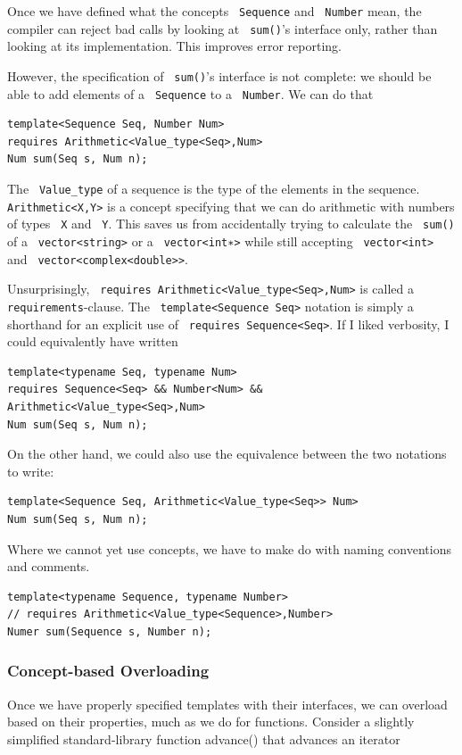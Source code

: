 \documentclass[11pt]{article}
\let\OldTexttt\texttt
\renewcommand{\texttt}[1]{\OldTexttt{\color{MidnightBlue} #1}}
\begin{document}
Once we have defined what the concepts \texttt{Sequence} and \texttt{Number} mean, the compiler can reject bad
calls by looking at \texttt{sum()}'s interface only, rather than looking at its implementation. This
improves error reporting.

However, the specification of \texttt{sum()}'s interface is not complete: we should be able to add
elements of a \texttt{Sequence} to a \texttt{Number}. We can do that
\begin{verbatim}
template<Sequence Seq, Number Num>
requires Arithmetic<Value_type<Seq>,Num>
Num sum(Seq s, Num n);
\end{verbatim}

The \texttt{Value\_type} of a sequence is the type of the elements in the sequence. \texttt{Arithmetic<X,Y>} is a
concept specifying that we can do arithmetic with numbers of types \texttt{X} and \texttt{Y}. This saves us from
accidentally trying to calculate the \texttt{sum()} of a \texttt{vector<string>} or a \texttt{vector<int∗>} while still
accepting \texttt{vector<int>} and \texttt{vector<complex<double>>}.

Unsurprisingly, \texttt{requires Arithmetic<Value\_type<Seq>,Num>} is called a \texttt{requirements}-clause. The
\texttt{template<Sequence Seq>} notation is simply a shorthand for an explicit use of \texttt{requires
    Sequence<Seq>}. If I liked verbosity, I could equivalently have written
\begin{verbatim}
template<typename Seq, typename Num>
requires Sequence<Seq> && Number<Num> && Arithmetic<Value_type<Seq>,Num>
Num sum(Seq s, Num n);
\end{verbatim}
On the other hand, we could also use the equivalence between the two notations to write:
\begin{verbatim}
template<Sequence Seq, Arithmetic<Value_type<Seq>> Num>
Num sum(Seq s, Num n);
\end{verbatim}
Where we cannot yet use concepts, we have to make do with naming conventions and comments.
\begin{verbatim}
template<typename Sequence, typename Number>
// requires Arithmetic<Value_type<Sequence>,Number>
Numer sum(Sequence s, Number n);
\end{verbatim}
\subsubsection{Concept-based Overloading}
\label{sec:org7b6261c}
Once we have properly specified templates with their interfaces, we can overload based on their
properties, much as we do for functions. Consider a slightly simplified standard-library
function advance() that advances an iterator
\end{document}
